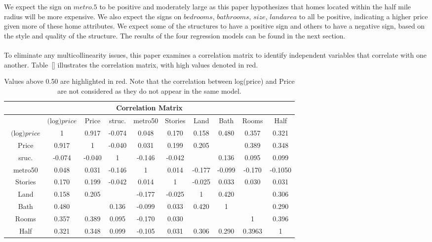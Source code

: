 \documentclass[12pt]{report}
\newcommand\tab[1][.50cm]{\hspace*{#1}}
\begin{document}
\tab We expect the sign on $metro.5$ to be positive and moderately large as this paper hypothesizes that homes located within the half mile radius will be more expensive. We also expect the signs on $bedrooms$, $bathrooms$, $size$, $landarea$ to all be positive, indicating a higher price given more of these home attributes. We expect some of the structures to have a positive sign and others to have a negative sign, based on the style and quality of the structure. The results of the four regression models can be found in the next section.\\ \\
\tab To eliminate any multicollinearity issues, this paper examines a correlation matrix to identify independent variables that correlate with one another. Table~\ref{} illustrates the correlation matrix, with high values denoted in red.
\begin{table}[h!]
\centering
\begin{tabular}{|c| c | c |c |c |c |c |c | c | c|} 
\hline
\multicolumn{10}{|c|}{ \textbf{Correlation Matrix}} \\
\hline\hline
	&$\text{(log)}price$&	Price&	 struc. & metro50&	Stories&	Land&	Bath&	Rooms&	Half\\[0.5ex] \hline \  
$\text{(log)}price$&	1&	0.917&  -0.074& 	0.048& 0.170&	0.158& 0.480	& 0.357&	0.321\\ [0.5ex]\hline \ 
Price&	0.917& 	1&-0.040&	0.031& 	0.199& 	0.205& 	\textbf{\color{red}{0.524}}& 0.389&	0.348\\ [0.5ex]\hline\ 
sruc.& -0.074&	-0.040	& 1&	-0.146& 	-0.042	& \textbf{\color{red}{0.505}}&	0.136&	0.095&	0.099 \\ [0.5ex]\hline \  
metro50&	0.048	&  0.031&-0.146&	1&	0.014& 	-0.177&	-0.099&	-0.170&	-0.1050\\ [0.5ex] \hline \ 
Stories&	0.170	&  0.199&-0.042& 	0.014&	1&	-0.025&	0.033& 0.030&	0.031\\ [0.5ex]\hline \ 
Land&	0.158& 0.205&\textbf{\color{red}{0.505}}&	-0.177&	-0.025&	1&	0.420	& \textbf{\color{red}{0.505}}&	0.306\\ [0.5ex] \hline \ 
Bath&	0.480& 	\textbf{\color{red}{0.524}}&0.136& 	-0.099&	0.033& 	0.420&1&	\textbf{\color{red}{0.694}}& 	0.290\\ [0.5ex]\hline \ 
Rooms&	0.357& 	0.389&0.095 & 	-0.170&	0.030& \textbf{\color{red}{0.506}}&	\textbf{\color{red}{0.694}}&	1&	0.396 \\ [0.5ex]\hline \ 
Half&	0.321& 	0.348&0.099& 	-0.105&	0.031&	0.306&	0.290& 	0.3963&	1 \\ [0.5ex]\hline
\hline
\end{tabular}
\caption{\footnotesize Values above 0.50 are highlighted in red. Note that the correlation between log(price) and Price are not considered as they do not appear in the same model.}
\label{table:1}
\end{table}
\end{document}
